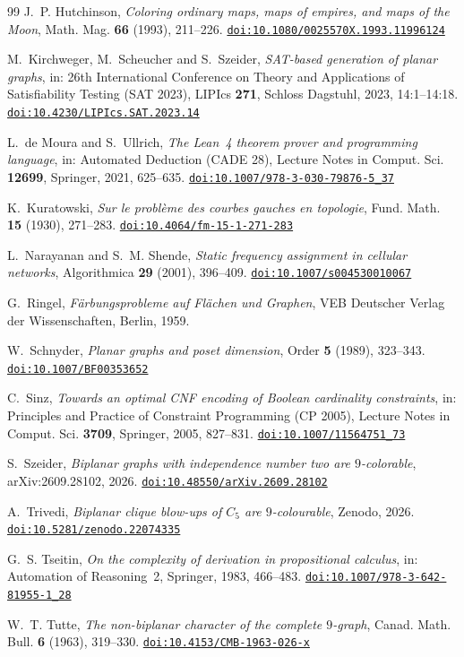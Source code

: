 \documentclass[11pt]{amsart}
\theoremstyle{definition}
\theoremstyle{remark}
\numberwithin{equation}{section}
\newcommand{\doi}[1]{\href{https://doi.org/#1}{\nolinkurl{doi:#1}}}
\begin{document}
\begin{thebibliography}{99}
J.~P. Hutchinson, \emph{Coloring ordinary maps, maps of empires, and maps of the Moon}, Math. Mag. \textbf{66} (1993), 211--226. \doi{10.1080/0025570X.1993.11996124}

M.~Kirchweger, M.~Scheucher and S.~Szeider, \emph{SAT-based generation of planar graphs}, in: 26th International Conference on Theory and Applications of Satisfiability Testing (SAT 2023), LIPIcs \textbf{271}, Schloss Dagstuhl, 2023, 14:1--14:18. \doi{10.4230/LIPIcs.SAT.2023.14}

L.~de Moura and S.~Ullrich, \emph{The Lean~4 theorem prover and programming language}, in: Automated Deduction (CADE 28), Lecture Notes in Comput. Sci. \textbf{12699}, Springer, 2021, 625--635. \doi{10.1007/978-3-030-79876-5_37}

K.~Kuratowski, \emph{Sur le probl\`eme des courbes gauches en topologie}, Fund. Math. \textbf{15} (1930), 271--283. \doi{10.4064/fm-15-1-271-283}

L.~Narayanan and S.~M. Shende, \emph{Static frequency assignment in cellular networks}, Algorithmica \textbf{29} (2001), 396--409. \doi{10.1007/s004530010067}

G.~Ringel, \emph{F\"arbungsprobleme auf Fl\"achen und Graphen}, VEB Deutscher Verlag der Wissenschaften, Berlin, 1959.

W.~Schnyder, \emph{Planar graphs and poset dimension}, Order \textbf{5} (1989), 323--343. \doi{10.1007/BF00353652}

C.~Sinz, \emph{Towards an optimal CNF encoding of Boolean cardinality constraints}, in: Principles and Practice of Constraint Programming (CP 2005), Lecture Notes in Comput. Sci. \textbf{3709}, Springer, 2005, 827--831. \doi{10.1007/11564751_73}

S.~Szeider, \emph{Biplanar graphs with independence number two are $9$-colorable}, arXiv:2609.28102, 2026. \doi{10.48550/arXiv.2609.28102}

A.~Trivedi, \emph{Biplanar clique blow-ups of $C_5$ are $9$-colourable}, Zenodo, 2026. \doi{10.5281/zenodo.22074335}

G.~S. Tseitin, \emph{On the complexity of derivation in propositional calculus}, in: Automation of Reasoning~2, Springer, 1983, 466--483. \doi{10.1007/978-3-642-81955-1_28}

W.~T. Tutte, \emph{The non-biplanar character of the complete $9$-graph}, Canad. Math. Bull. \textbf{6} (1963), 319--330. \doi{10.4153/CMB-1963-026-x}

\end{thebibliography}
\end{document}
